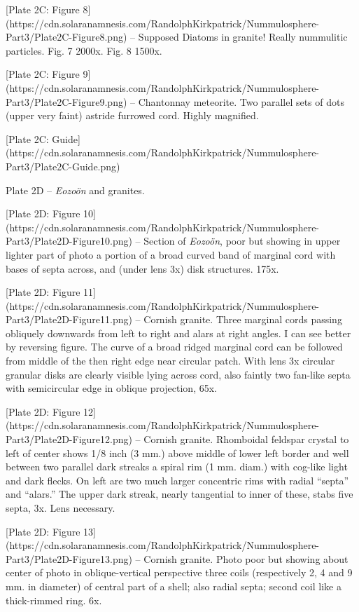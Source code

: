 \documentclass[a4paper, 12pt, oneside]{article}
\begin{document}
[Plate 2C: Figure 8](https://cdn.solaranamnesis.com/RandolphKirkpatrick/Nummulosphere-Part3/Plate2C-Figure8.png) -- Supposed Diatoms in granite! Really nummulitic particles. Fig. 7 2000x. Fig. 8 1500x.

[Plate 2C: Figure 9](https://cdn.solaranamnesis.com/RandolphKirkpatrick/Nummulosphere-Part3/Plate2C-Figure9.png) -- Chantonnay meteorite. Two parallel sets of dots (upper very faint) astride furrowed cord. Highly magnified.

[Plate 2C: Guide](https://cdn.solaranamnesis.com/RandolphKirkpatrick/Nummulosphere-Part3/Plate2C-Guide.png)

Plate 2D -- \emph{Eozoön} and granites.

[Plate 2D: Figure 10](https://cdn.solaranamnesis.com/RandolphKirkpatrick/Nummulosphere-Part3/Plate2D-Figure10.png) -- Section of \emph{Eozoön}, poor but showing in upper lighter part of photo a portion of a broad curved band of marginal cord with bases of septa across, and (under lens 3x) disk structures. 175x.

[Plate 2D: Figure 11](https://cdn.solaranamnesis.com/RandolphKirkpatrick/Nummulosphere-Part3/Plate2D-Figure11.png) -- Cornish granite. Three marginal cords passing obliquely downwards from left to right and alars at right angles. I can see better by reversing figure. The curve of a broad ridged marginal cord can be followed from middle of the then right edge near circular patch. With lens 3x circular granular disks are clearly visible lying across cord, also faintly two fan-like septa with semicircular edge in oblique projection, 65x.

[Plate 2D: Figure 12](https://cdn.solaranamnesis.com/RandolphKirkpatrick/Nummulosphere-Part3/Plate2D-Figure12.png) -- Cornish granite. Rhomboidal feldspar crystal to left of center shows 1/8 inch (3 mm.) above middle of lower left border and well between two parallel dark streaks a spiral rim (1 mm. diam.) with cog-like light and dark flecks. On left are two much larger concentric rims with radial ``septa'' and ``alars.'' The upper dark streak, nearly tangential to inner of these, stabs five septa, 3x. Lens necessary.

[Plate 2D: Figure 13](https://cdn.solaranamnesis.com/RandolphKirkpatrick/Nummulosphere-Part3/Plate2D-Figure13.png) -- Cornish granite. Photo poor but showing about center of photo in oblique-vertical perspective three coils (respectively 2, 4 and 9 mm. in diameter) of central part of a shell; also radial septa; second coil like a thick-rimmed ring. 6x.
\end{document}
